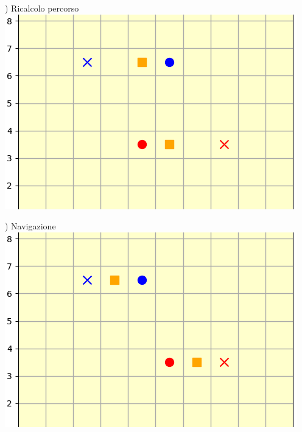 \documentclass[12pt]{article}
\begin{document}
\vspace{1cm}

\noindent \begin{minipage}[ht]{0.45\linewidth}
) Ricalcolo percorso
\includegraphics[width=\textwidth]{SimulazioniNavigazione/2AGV_NoConflitti/2.png}
\end{minipage}
\begin{minipage}[ht]{0.45\linewidth}
) Navigazione
\includegraphics[width=\textwidth]{SimulazioniNavigazione/2AGV_NoConflitti/3.png}
\end{minipage}\\

\vspace{1cm}
\end{document}
